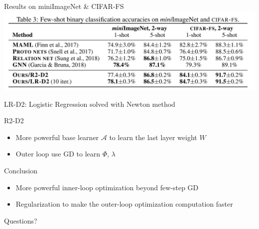 \documentclass{beamer}
\begin{document}
\begin{frame}[t]{Results on miniImageNet \& CIFAR-FS}
  \includegraphics[width=\textwidth]{fig/r2d2-result.png}

  LR-D2: Logistic Regression solved with Newton method
\end{frame}

\begin{frame}[t]{R2-D2}
  \begin{itemize}
    \item More powerful base learner $\mathcal{A}$ to learn the last layer weight $W$
    \item Outer loop use GD to learn $\Phi$, $\lambda$
  \end{itemize}
\end{frame}

\begin{frame}{Conclusion}
  \begin{itemize}
    \item More powerful inner-loop optimization beyond few-step GD
    \item Regularization to make the outer-loop optimization computation faster
  \end{itemize}
\end{frame}
\begin{frame}
	\begin{center}
    \LARGE{Questions?}
	\end{center}
\end{frame}
\end{document}
